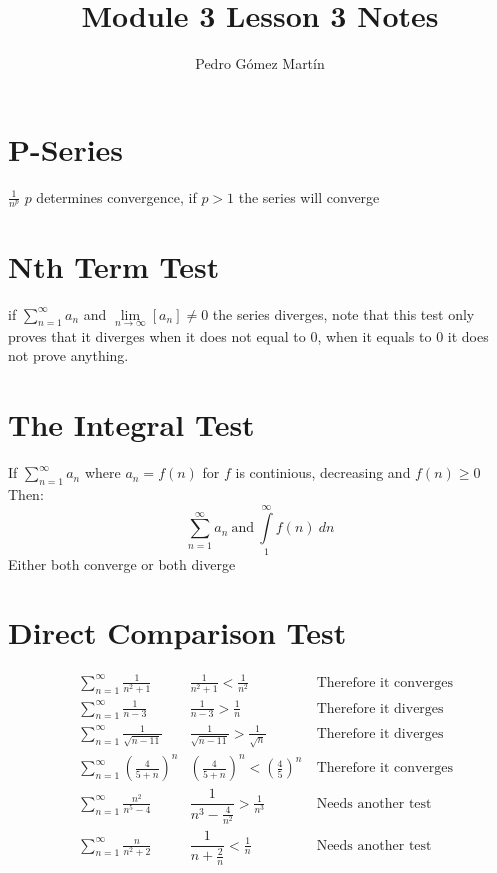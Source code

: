 \documentclass[a4paper]{article}
\title{Module 3 Lesson 3 Notes}
\author{Pedro G\'{o}mez Mart\'{i}n}
\begin{document}
\maketitle

\section{P-Series}
	$\frac{1}{n^{p}}$ $p$ determines convergence, if $p>1$ the series will converge

\section{Nth Term Test}
	if $\sum\limits_{n=1}^{\infty}{a_n}$ and $\lim\limits_{n\rightarrow \infty}\left[{a_n}\right] \not= 0$ the series diverges, note that this test only proves that it diverges when it does not equal to 0, when it equals to 0 it does not prove anything.

\section{The Integral Test}
	If $\sum\limits_{n=1}^{\infty}{a_n}$ where $a_n = f\left(n\right)$ for $f$ is continious, decreasing and $f\left(n\right)\geq 0$\\ Then:
	\begin{equation*}
	\sum\limits_{n=1}^{\infty}{a_n} \ \text {and} \ \int\limits_{1}^{\infty}{f\left(n\right)}\ dn
	\end{equation*}
	Either both converge or both diverge

\section{Direct Comparison Test}
	\begin{align*}
	&\sum\limits_{n=1}^{\infty}{\frac{1}{n^{2}+1}} &\frac{1}{n^{2}+1}<\frac{1}{n^2}\ &\text{Therefore\ it\ converges}\\
	&\sum\limits_{n=1}^{\infty}{\frac{1}{n-3}} &\frac{1}{n-3}>\frac{1}{n}\ &\text{Therefore it diverges}\\
	&\sum\limits_{n=1}^{\infty}{\frac{1}{\sqrt{n-11}}} &\frac{1}{\sqrt{n-11}}>\frac{1}{\sqrt{n}}\ &\text{Therefore it diverges}\\
	&\sum\limits_{n=1}^{\infty}{\left(\frac{4}{5+n}\right)^n} &\left(\frac{4}{5+n}\right)^n<\left(\frac{4}{5}\right)^n\ &\text{Therefore it converges}\\
	&\sum\limits_{n=1}^{\infty}{\frac{n^2}{n^5-4}} &\dfrac{1}{n^{3}-\frac{4}{n^2}}>\frac{1}{n^3}\ &\text{Needs another test}\\
	&\sum\limits_{n=1}^{\infty}{\frac{n}{n^2+2}} &\dfrac{1}{n+\frac{2}{n}}<\frac{1}{n}\ &\text{Needs another test}
	\end{align*}
\end{document}
